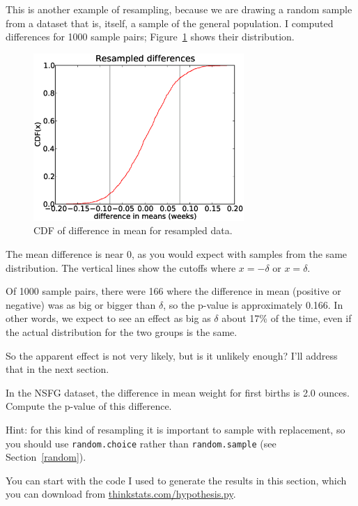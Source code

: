 \documentclass[12pt]{book}
\begin{document}

This is another example of resampling, because we are drawing a
random sample from a dataset that is, itself, a sample of the general
population.  I computed differences for 1000 sample pairs;
Figure~\ref{length_deltas_cdf} shows their distribution.

\begin{figure}
\centerline{\includegraphics[height=2.5in]{figs/length_deltas_cdf.eps}}
\caption{CDF of difference in mean for resampled data.}
\label{length_deltas_cdf}
\end{figure}

The mean difference is near 0, as you would expect with samples
from the same distribution.  The vertical lines show the cutoffs where
$x=-\delta$ or $x=\delta$.

Of 1000 sample pairs, there were 166 where the difference in mean
(positive or negative) was as big or bigger than $\delta$, so the
p-value is approximately 0.166.  In other words, we expect to see an
effect as big as $\delta$ about 17\% of the time, even if the actual
distribution for the two groups is the same.

So the apparent effect is not very likely, but is it unlikely enough?
I'll address that in the next section.

\begin{exercise}
In the NSFG dataset, the difference in mean weight for first
births is 2.0 ounces.  Compute the p-value of this difference.


Hint: for this kind of resampling it is important to sample
with replacement, so you should use {\tt random.choice} rather
than {\tt random.sample} (see Section~\ref{random}).


You can start with the code I used to generate the results in this
section, which you can download from \url{thinkstats.com/hypothesis.py}.


\end{exercise}
\end{document}
